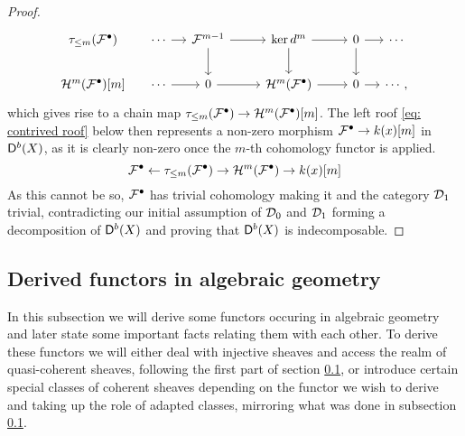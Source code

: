 \begin{proof}
\[\begin{tikzcd}[row sep = small, column sep = small]
        {\rtruncation{m}(\mathcal F^\bullet)} & \cdots & {\mathcal F^{m-1}} && {\ker d^m} && 0 & \cdots \\
        \\
        {\mathcal H^m(\mathcal F^\bullet)[m]} & \cdots & 0 && {\mathcal H^m(\mathcal F^\bullet)} && 0 & \cdots,
        \arrow[from=1-2, to=1-3]
        \arrow[from=1-3, to=1-5]
        \arrow[from=1-3, to=3-3]
        \arrow[from=1-5, to=1-7]
        \arrow[from=1-5, to=3-5]
        \arrow[from=1-7, to=1-8]
        \arrow[from=1-7, to=3-7]
        \arrow[from=3-2, to=3-3]
        \arrow[from=3-3, to=3-5]
        \arrow[from=3-5, to=3-7]
        \arrow[from=3-7, to=3-8]
    \end{tikzcd}\]
    which gives rise to a chain map $\tau_{\leq m}(\mathcal F^\bullet) \to \mathcal H^m(\mathcal F^\bullet)[m]$. The left roof \eqref{eq: contrived roof} below then represents a non-zero morphism $\mathcal F^\bullet \to k(x)[m]$ in $\mathsf{D}^b(X)$, as it is clearly non-zero once the $m$-th cohomology functor is applied.
    \begin{equation}
        \label{eq: contrived roof}
        \mathcal F^\bullet \leftarrow \tau_{\leq m}(\mathcal F^\bullet) \to \mathcal H^m(\mathcal F^\bullet) \to k(x)[m]
    \end{equation}
    As this cannot be so, $\mathcal F^\bullet$ has trivial cohomology making it and the category $\mathcal D_1$ trivial, contradicting our initial assumption of $\mathcal D_0$ and $\mathcal D_1$ forming a decomposition of $\mathsf{D}^b(X)$ and proving that $\mathsf{D}^b(X)$ is indecomposable. 
\end{proof}


\newpage

\subsection{Derived functors in algebraic geometry}

In this subsection we will derive some functors occuring in algebraic geometry and later state some important facts relating them with each other. To derive these functors we will either deal with injective sheaves and access the realm of quasi-coherent sheaves, following the first part of section \ref{}, or introduce certain special classes of coherent sheaves depending on the functor we wish to derive and taking up the role of adapted classes, mirroring what was done in subsection \ref{}.

